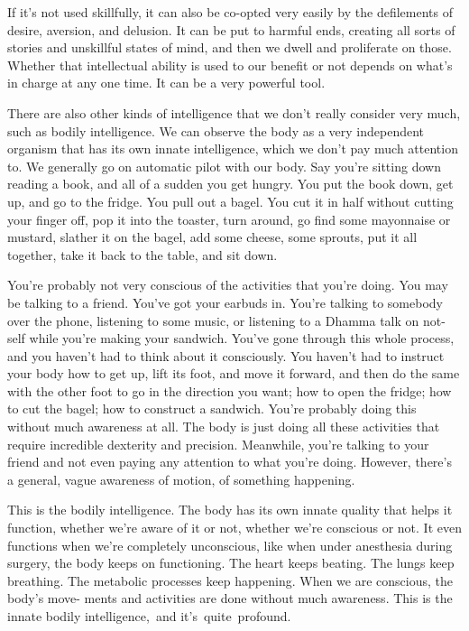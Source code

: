 If it's not used skillfully, it can also be co-opted very easily by the defilements of desire, aversion, and delusion. It can be put to harmful ends, creating all sorts of stories and unskillful states of mind, and then we dwell and proliferate on those. Whether that intellectual ability is used to our benefit or not depends on what's in charge at any one time. It can be a very powerful tool.

There are also other kinds of intelligence that we don't really consider very much, such as bodily intelligence. We can observe the body as a very independent organism that has its own innate intelligence, which we don't pay much attention to. We generally go on automatic pilot with our body. Say you're sitting down reading a book, and all of a sudden you get hungry. You put the book down, get up, and go to the fridge. You pull out a bagel. You cut it in half without cutting your finger off, pop it into the toaster, turn around, go find some mayonnaise or mustard, slather it on the bagel, add some cheese, some sprouts, put it all together, take it back to the table, and sit down.

You're probably not very conscious of the activities \linebreak that you're doing. You may be talking to a friend. You've got your earbuds in. You're talking to somebody over the phone, lis\-tening to some music, or listening to a Dhamma talk on not-self while you're making your sandwich. You've gone through this whole process, and you haven't had to think about it consciously. You haven't had to instruct your body how to get up, lift its foot, and move it forward, and then do the same with the other foot to go in the direction you want; how to open the fridge; how to cut the bagel; how to construct a sandwich. You're probably doing this without much awareness at all. The body is just doing all these activities that require incredible dexterity and precision. Meanwhile, you're talking to your friend and not even paying any attention to what you're doing. However, there's a general, vague awareness of motion, of something happening.

This is the bodily intelligence. The body has its own innate quality that helps it function, whether we're aware of it or not, whether we're conscious or not. It even functions when we're completely unconscious, like when under anesthesia during surgery, the body keeps on functioning. The heart keeps beating. The lungs keep breathing. The metabolic processes keep happening. When we are conscious, the body's move- \linebreak ments and activities are done without much awareness. This is the innate bodily \mbox{intelligence, and} \mbox{it's quite profound.}

